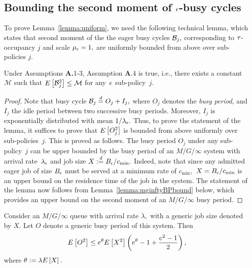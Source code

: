 \subsection{Bounding the second moment of ${ \epsilon }$-busy cycles}
\label{sec:busycycles}
To prove Lemma~\ref{lemma:uniform}, we need the following technical
lemma, which states that second moment of the the eager busy cycles
$\mathcal{B}_j,$ corresponding to ${\tau}$-occupancy $j$ and scale ${\mu_\epsilon} = 1,$ are
uniformly bounded from above over sub-policies $j.$

\begin{lemma}
  \label{lemma:bp_upper_bound}
  Under Assumptions {\bf A.}1-3,  Assumption {\bf A}.4 is true, i.e., there exists a constant $\mathcal{M}$
  such that $E\left[\mathcal{B}_j^2\right] \leq \mathcal{M}$ for any~${ \epsilon }$
  sub-policy~$j.$
\end{lemma}
\begin{proof}
  Note that busy cycle $\mathcal{B}_j\stackrel{d}{=} O_j + I_j,$ where $O_j$ denotes the
  \emph{busy period}, and $I_j$ the idle period between two successive
  busy periods. Moreover, $I_j$ is exponentially distributed with mean
  $1/\lambda_{ \epsilon }.$ Thus, to prove the statement of the lemma, it
  suffices to prove that $E\left[O_j^2\right]$ is bounded from above uniformly
  over sub-policies~$j.$ This is proved as follows. The busy period
  $O_j$ under any sub-policy~$j$ can be upper bounded by the busy
  period of an $M/G/\infty$ system with arrival rate~$\lambda_{ \epsilon }$ and
  job size $X :\stackrel{d}{=} B_{ \epsilon }/c_{\min}.$ Indeed, note that since any
  admitted eager job of size $B_{ \epsilon }$ must be served at a minimum rate
  of $c_{\min},$ $X = B_{ \epsilon }/c_{\min}$ is an upper bound on the
  residence time of the job in the system. The statement of the lemma
  now follows from Lemma~\ref{lemma:mginftyBPbound} below, which
  provides an upper bound on the second moment of an $M/G/\infty$ busy
  period.
\end{proof}
 
\begin{lemma}
  \label{lemma:mginftyBPbound}
  Consider an $M/G/\infty$ queue with arrival rate $\lambda,$ with a
  generic job size denoted by $X$. Let $O$ denote a generic busy
  period of this system. Then
  $$E\left[O^2\right] \leq e^{\theta} E\left[X^2\right] \left(e^{\theta} - 1 + \frac{e^2-1}{2}
  \right),$$ where $\theta := \lambda E\left[X\right].$
\end{lemma}

